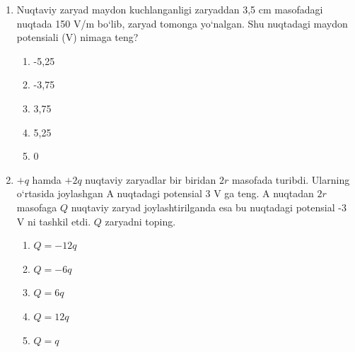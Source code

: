 \begin{enumerate}
    \item Nuqtaviy zaryad maydon kuchlanganligi zaryaddan 3,5 cm masofadagi nuqtada 150 V/m bo‘lib, zaryad tomonga yo‘nalgan. Shu nuqtadagi maydon potensiali (V) nimaga teng?
    \begin{enumerate}[label=\Alph*)]
        \item -5,25
        \item -3,75
        \item 3,75
        \item 5,25
        \item 0
    \end{enumerate}

    \item $+q$ hamda $+2q$ nuqtaviy zaryadlar bir biridan $2r$ masofada turibdi. Ularning o‘rtasida joylashgan A nuqtadagi potensial 3 V ga teng. A nuqtadan $2r$ masofaga $Q$ nuqtaviy zaryad joylashtirilganda esa bu nuqtadagi potensial -3 V ni tashkil etdi. $Q$ zaryadni toping.

    
    \begin{enumerate}[label=\Alph*)]
        \item $Q = -12q$
        \item $Q = -6q$
        \item $Q = 6q$
        \item $Q = 12q$
        \item $Q = q$
    \end{enumerate}


\end{enumerate}
